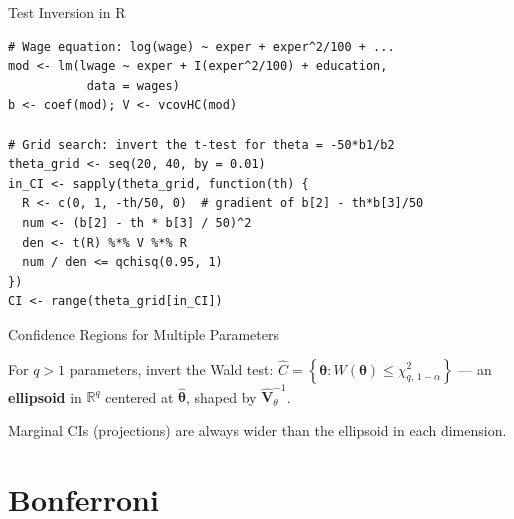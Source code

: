 \documentclass[handout, aspectratio=169]{beamer}
\numberwithin{equation}{section}
\begin{document}
\begin{frame}[fragile]{Test Inversion in R}
\begin{lstlisting}
# Wage equation: log(wage) ~ exper + exper^2/100 + ...
mod <- lm(lwage ~ exper + I(exper^2/100) + education,
           data = wages)
b <- coef(mod); V <- vcovHC(mod)

# Grid search: invert the t-test for theta = -50*b1/b2
theta_grid <- seq(20, 40, by = 0.01)
in_CI <- sapply(theta_grid, function(th) {
  R <- c(0, 1, -th/50, 0)  # gradient of b[2] - th*b[3]/50
  num <- (b[2] - th * b[3] / 50)^2
  den <- t(R) %*% V %*% R
  num / den <= qchisq(0.95, 1)
})
CI <- range(theta_grid[in_CI])
\end{lstlisting}
\end{frame}

\begin{frame}{Confidence Regions for Multiple Parameters}

For $q > 1$ parameters, invert the Wald test:
$\hat{C} = \left\{\bm{\theta} : W(\bm{\theta}) \leq \chi^2_{q,\,1-\alpha}\right\}$
--- an \textbf{ellipsoid} in $\mathbb{R}^q$ centered at $\hat{\bm{\theta}}$, shaped by $\hat{\bm{V}}_\theta^{-1}$.

\pause

\begin{center}
\end{center}

\vspace{-0.3cm}
Marginal CIs (projections) are always wider than the ellipsoid in each dimension.
\end{frame}

\section{Bonferroni}
\setcounter{subsection}{1}
\end{document}
